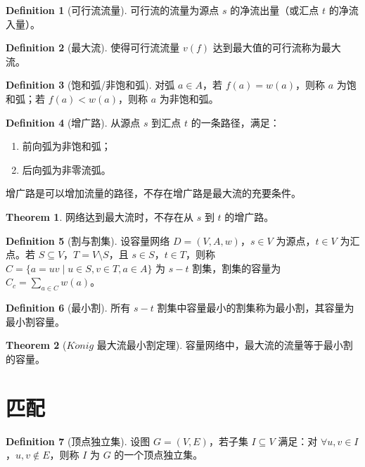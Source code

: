 \documentclass[oneside]{book}
\theoremstyle{definition}
\newtheorem{definition}{Definition}[section]
\newtheorem{theorem}{Theorem}[section]
\begin{document}
\begin{definition}[可行流流量]
	可行流的流量为源点 \( s \) 的净流出量（或汇点 \( t \) 的净流入量）。
\end{definition}

\begin{definition}[最大流]
	使得可行流流量 \( v(f) \) 达到最大值的可行流称为最大流。
\end{definition}

\begin{definition}[饱和弧/非饱和弧]
	对弧 \( a \in A \)，若 \( f(a) = w(a) \)，则称 \( a \) 为饱和弧；若 \( f(a) < w(a) \)，则称 \( a \) 为非饱和弧。
\end{definition}

\begin{definition}[增广路]
	从源点 \( s \) 到汇点 \( t \) 的一条路径，满足：
	\begin{enumerate}
		\item 前向弧为非饱和弧；
		\item 后向弧为非零流弧。
	\end{enumerate}
	增广路是可以增加流量的路径，不存在增广路是最大流的充要条件。
\end{definition}

\begin{theorem}
	网络达到最大流时，不存在从 \( s \) 到 \( t \) 的增广路。
\end{theorem}

\begin{definition}[割与割集]
	设容量网络 \( D = (V, A, w) \)，\( s \in V \) 为源点，\( t \in V \) 为汇点。若 \( S \subseteq V \)，\( T = V \setminus S \)，且 \( s \in S \)，\( t \in T \)，则称 \( C = \{ a=uv \mid u \in S, v \in T, a \in A \} \) 为 \( s-t \) 割集，割集的容量为 \( C_c = \sum_{a \in C }w(a) \)。
\end{definition}

\begin{definition}[最小割]
	所有 \( s-t \) 割集中容量最小的割集称为最小割，其容量为最小割容量。
\end{definition}

\begin{theorem}[\(K\ddot{o}nig\) 最大流最小割定理]
	容量网络中，最大流的流量等于最小割的容量。
\end{theorem}

\section{匹配}
\begin{definition}[顶点独立集]
	设图 \( G = (V, E) \)，若子集 \( I \subseteq V \) 满足：对 \( \forall u, v \in I \)，\( u,v \notin E \)，则称 \( I \) 为 \( G \) 的一个顶点独立集。
\end{definition}
\end{document}
